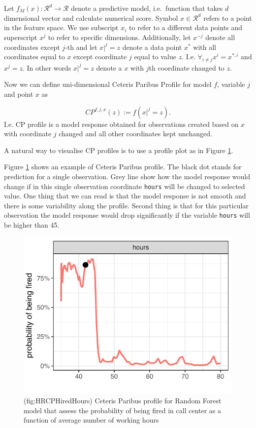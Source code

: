 \documentclass[]{book}
\theoremstyle{definition}
\theoremstyle{definition}
\theoremstyle{definition}
\theoremstyle{remark}
\begin{document}
Let \(f_{M}(x): \mathcal R^{d} \rightarrow \mathcal R\) denote a
predictive model, i.e.~function that takes \(d\) dimensional vector and
calculate numerical score. Symbol \(x \in \mathcal R^d\) refers to a
point in the feature space. We use subscript \(x_i\) to refer to a
different data points and superscript \(x^j\) to refer to specific
dimensions. Additionally, let \(x^{-j}\) denote all coordinates except
\(j\)-th and let \(x|^j=z\) denote a data point \(x^*\) with all
coordinates equal to \(x\) except coordinate \(j\) equal to value \(z\).
I.e. \(\forall_{i \neq {j}} x^i = x^{*,i}\) and \(x^j = z\). In other
words \(x|^j=z\) denote a \(x\) with \(j\)th coordinate changed to
\(z\).

Now we can define uni-dimensional Ceteris Paribus Profile for model
\(f\), variable \(j\) and point \(x\) as

\[
CP^{f, j, x}(z) := f(x|^j = z).
\] I.e. CP profile is a model response obtained for observations created
based on \(x\) with coordinate \(j\) changed and all other coordinates
kept unchanged.

A natural way to visualise CP profiles is to use a profile plot as in
Figure \ref{fig:HRCPFiredHours}.

Figure \ref{fig:HRCPFiredHours} shows an example of Ceteris Paribus
profile. The black dot stands for prediction for a single observation.
Grey line show how the model response would change if in this single
observation coordinate \texttt{hours} will be changed to selected value.
One thing that we can read is that the model response is not smooth and
there is some variability along the profile. Second thing is that for
this particular observation the model response would drop significantly
if the variable \texttt{hours} will be higher than 45.

\begin{figure}

{\centering \includegraphics[width=0.5\linewidth]{figure/HR_cp_fired_hours} 

}

\caption{(fig:HRCPHiredHours) Ceteris Paribus profile for Random Forest model that assess the probability of being fired in call center as a function of average number of working hours}\label{fig:HRCPFiredHours}
\end{figure}
\end{document}
